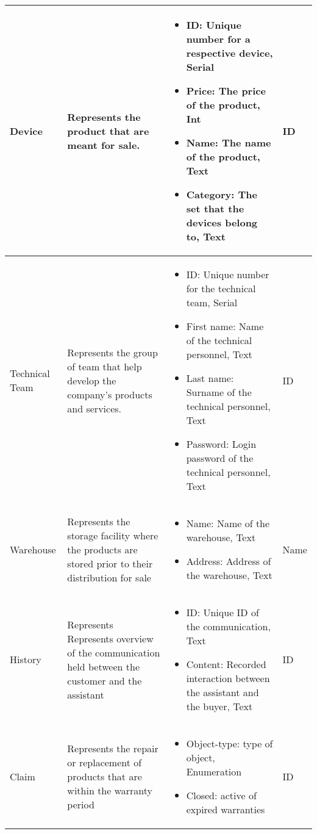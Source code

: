 \begin{longtable}{|p{}|p{} |p{}|p{} |}
Device & Represents the product that are meant for sale. & \begin{itemize}
    \item ID: Unique number for a respective device, Serial
    \item Price: The price of the product, Int
    \item Name: The name of the product, Text
    \item Category: The set that the devices belong to, Text
\end{itemize} & ID \\\hline

Technical Team &
 Represents the group of team that help develop the company's products and services.
 & \begin{itemize}
     \item ID: Unique number for the technical team, Serial
     \item First name: Name of the technical personnel, Text
     \item Last name: Surname of the technical personnel, Text
     \item Password: Login password of the technical personnel, Text
 \end{itemize} & ID \\\hline

 Warehouse & 
 Represents the storage facility where the products are stored prior to their distribution for sale
 & \begin{itemize}
     \item Name: Name of the warehouse, Text
     \item Address: Address of the warehouse, Text
 \end{itemize} & Name \\\hline

 History &
 Represents Represents overview of the communication held between the customer and the assistant
 & \begin{itemize}
     \item ID: Unique ID of the communication, Text
     \item Content: Recorded interaction between the assistant and the buyer, Text
 \end{itemize} & ID\\\hline 

Claim &
Represents the repair or replacement of products that are within the warranty period
& \begin{itemize}
    \item Object-type: type of object, Enumeration
    \item Closed: active of expired warranties 
\end{itemize}
& ID \\\hline
\end{longtable}
